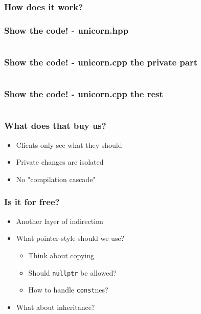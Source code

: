 \begin{frame}[c]
  \frametitle{How does it work?}
  \pause{}
\end{frame}

\begin{frame}[c]
  \frametitle{Show the code! - unicorn.hpp}
  \inputminted[fontsize=\footnotesize,firstline=8,lastline=20]{cpp}{code/pimpl/unicorn.hpp}
\end{frame}

\begin{frame}[c]
  \frametitle{Show the code! - unicorn.cpp the private part}
  \inputminted[fontsize=\scriptsize,firstline=3,lastline=19]{cpp}{code/pimpl/unicorn.cpp}
\end{frame}

\begin{frame}[c]
  \frametitle{Show the code! - unicorn.cpp the rest}
  \inputminted[fontsize=\footnotesize,firstline=21]{cpp}{code/pimpl/unicorn.cpp}
\end{frame}

\begin{frame}[c]
  \frametitle{What does that buy us?}
  \pause{}
  \begin{itemize}
    \item{Clients only see what they should}\pause{}
    \item{Private changes are isolated}\pause{}
    \item{No "compilation cascade"}
  \end{itemize}
\end{frame}

\begin{frame}[c]
  \frametitle{Is it for free?}
  \pause{}
  \begin{itemize}
    \item{Another layer of indirection}\pause{}
    \item{What pointer-style should we use?}\pause{}
      \begin{itemize}
        \item{Think about copying}\pause{}
        \item{Should \texttt{nullptr} be allowed?}\pause{}
        \item{How to handle \texttt{const}nes?}\pause{}
      \end{itemize}
    \item{What about inheritance?}
  \end{itemize}
\end{frame}
